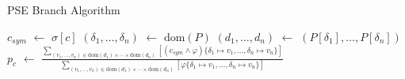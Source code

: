 \documentclass[acmsmall]{acmart}\settopmatter{}
\newcommand*\Let[2]{\State #1 $\gets$ #2}
\newcommand*\dom[1]{\mathrm{dom}\left( #1 \right)}
\begin{document}
	\begin{algorithm}
		\caption{PSE Branch Algorithm}
		\label{alg:branch}
		\begin{algorithmic}[1]
			\Let{$c_{sym}$}{$\sigma[c]$}
			\Let{$(\delta_1,\ldots,\delta_n)$}{$\dom{P}$}
			\Let{$(d_1,\ldots,d_n)$}{$(P[\delta_1],\ldots,P[\delta_n])$}
			\Let{$p_c$}{$\frac{\displaystyle\sum_{(v_1,\ldots,v_n) \in \dom{d_1} \times \cdots\times \dom{d_n}} [(c_{sym} \wedge \varphi)\{\delta_1 \mapsto v_1,\ldots,\delta_n \mapsto v_n\}]}{\displaystyle\sum_{(v_1,\ldots,v_n) \in \dom{d_1} \times \cdots\times \dom{d_n}}[\varphi\{\delta_1 \mapsto v_1,\ldots,\delta_n \mapsto v_n\}]}$}\\
			\EndFunction
		\end{algorithmic}
	\end{algorithm}
	
\end{document}
